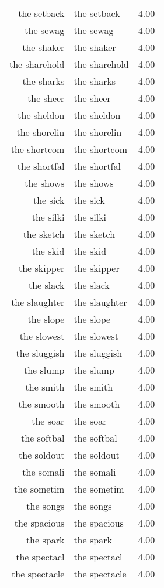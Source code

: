 \begin{table}[ht]
\begin{tabular}{rlr}
  the setback & the setback & 4.00 \\ 
  the sewag & the sewag & 4.00 \\ 
  the shaker & the shaker & 4.00 \\ 
  the sharehold & the sharehold & 4.00 \\ 
  the sharks & the sharks & 4.00 \\ 
  the sheer & the sheer & 4.00 \\ 
  the sheldon & the sheldon & 4.00 \\ 
  the shorelin & the shorelin & 4.00 \\ 
  the shortcom & the shortcom & 4.00 \\ 
  the shortfal & the shortfal & 4.00 \\ 
  the shows & the shows & 4.00 \\ 
  the sick & the sick & 4.00 \\ 
  the silki & the silki & 4.00 \\ 
  the sketch & the sketch & 4.00 \\ 
  the skid & the skid & 4.00 \\ 
  the skipper & the skipper & 4.00 \\ 
  the slack & the slack & 4.00 \\ 
  the slaughter & the slaughter & 4.00 \\ 
  the slope & the slope & 4.00 \\ 
  the slowest & the slowest & 4.00 \\ 
  the sluggish & the sluggish & 4.00 \\ 
  the slump & the slump & 4.00 \\ 
  the smith & the smith & 4.00 \\ 
  the smooth & the smooth & 4.00 \\ 
  the soar & the soar & 4.00 \\ 
  the softbal & the softbal & 4.00 \\ 
  the soldout & the soldout & 4.00 \\ 
  the somali & the somali & 4.00 \\ 
  the sometim & the sometim & 4.00 \\ 
  the songs & the songs & 4.00 \\ 
  the spacious & the spacious & 4.00 \\ 
  the spark & the spark & 4.00 \\ 
  the spectacl & the spectacl & 4.00 \\ 
  the spectacle & the spectacle & 4.00 \\ 

\end{tabular}
\end{table}
